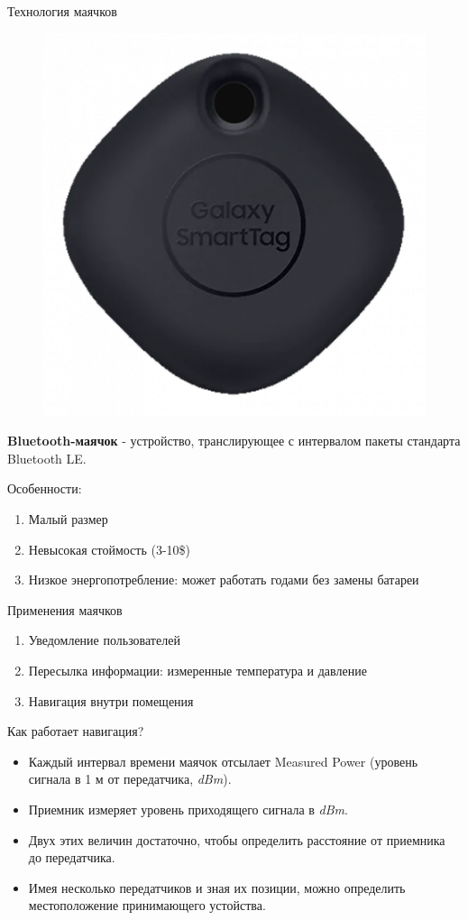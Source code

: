 

\begin{frame}
	\titlepage
\end{frame}

\begin{frame}{Технология маячков}
	\begin{figure}
		\includegraphics[width=0.15\linewidth]{images/beacon.png}
	\end{figure}
	\textbf{Bluetooth-маячок} - устройство, транслирующее с интервалом пакеты 
	стандарта Bluetooth LE.
	
	Особенности:
	\begin{enumerate}
		\item Малый размер
		\item Невысокая стоймость (3-10\$)
		\item Низкое энергопотребление: может работать годами без замены батареи
	\end{enumerate}
\end{frame}

\begin{frame}{Применения маячков}
	\begin{enumerate}
		\item Уведомление пользователей
		\item Пересылка информации: измеренные температура и давление
		\item Навигация внутри помещения
	\end{enumerate}
\end{frame}

\begin{frame}{Как работает навигация?}
	\begin{itemize}
		\item Каждый интервал времени маячок отсылает Measured Power (уровень сигнала в 1 м от передатчика, \textit{dBm}).
		\item Приемник измеряет уровень приходящего сигнала в \textit{dBm}. 
		\item Двух этих величин достаточно, чтобы определить расстояние от приемника до передатчика.
		\item Имея несколько передатчиков и зная их позиции, можно определить местоположение принимающего устойства.
	\end{itemize}
\end{frame}

